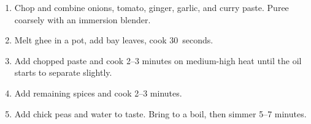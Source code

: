 
\begin{ingredients}
\end{ingredients}


\begin{recipe}
  \begin{enumerate}

  \item Chop and combine onions, tomato, ginger, garlic, and curry
    paste.  Puree coarsely with an immersion blender.
    
  \item Melt ghee in a pot, add bay leaves, cook 30~seconds.

  \item Add chopped paste and cook 2--3 minutes on medium-high heat
    until the oil starts to separate slightly.
    
  \item Add remaining spices and cook 2--3 minutes.
    
  \item Add chick peas and water to taste.  Bring to a boil, then
    simmer 5--7 minutes.

  \end{enumerate}
\end{recipe}

